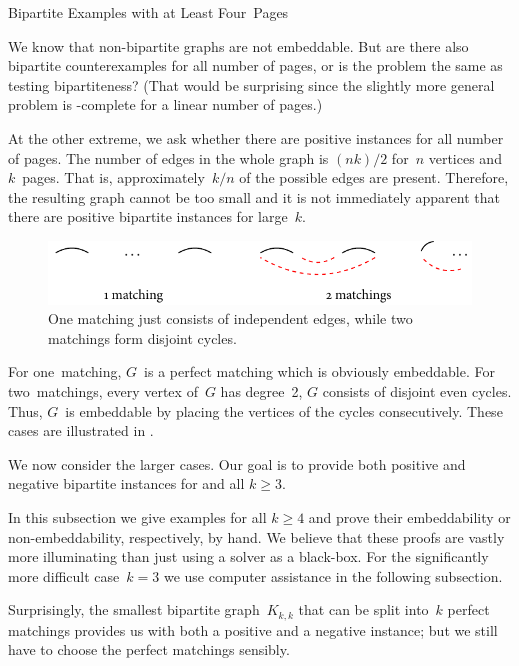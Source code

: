 \begin{subsection}{Bipartite Examples with at Least Four~Pages}\label{subsec:four}

We know that non-bipartite graphs are not embeddable. But are there also bipartite counterexamples
for all number of pages, or is the problem the same as testing bipartiteness? (That would be surprising since the slightly more general problem \probNotMatching is \NP-complete for a linear number of pages.) 

At the other extreme, we ask whether there are positive instances
for all number of pages. The number of edges
in the whole graph is $(nk)/2$ for~$n$ vertices and $k$~pages. That is, 
approximately~$k/n$ of the possible edges are present. Therefore,
the resulting graph cannot be too small and it is not immediately apparent that there
are positive bipartite instances for large~$k$.

\begin{figure}\centering
    \includegraphics[width=\textwidth]{figures/t_two_matchings}
    \caption[One and two matchings]{One matching just consists of independent edges, while two matchings form disjoint cycles.}
    \label{figure:two_matchings}
\end{figure}

For one~matching, $G$~is a perfect matching which is obviously embeddable.
For two~matchings, every vertex of~$G$ has degree~2, \ie $G$ consists of disjoint
even cycles. Thus, $G$~is embeddable by placing the vertices of the cycles consecutively.
These cases are illustrated in .

We now consider the larger cases.
Our goal is to provide both positive and negative
bipartite instances for \probMatching and all $k \geq 3$.

In this subsection we give examples for all $k \geq 4$ and
prove their embeddability or non-embeddability, respectively, by hand.
We believe that these proofs are vastly more illuminating than
just using a \SAT solver as a black-box. For the significantly more
difficult case~$k = 3$ we use computer assistance in the following subsection.

Surprisingly, the smallest bipartite graph~$K_{k,k}$ that can be split
into~$k$ perfect matchings provides us with both a positive and
a negative instance; but we still have to choose the perfect matchings sensibly.


\end{subsection}
